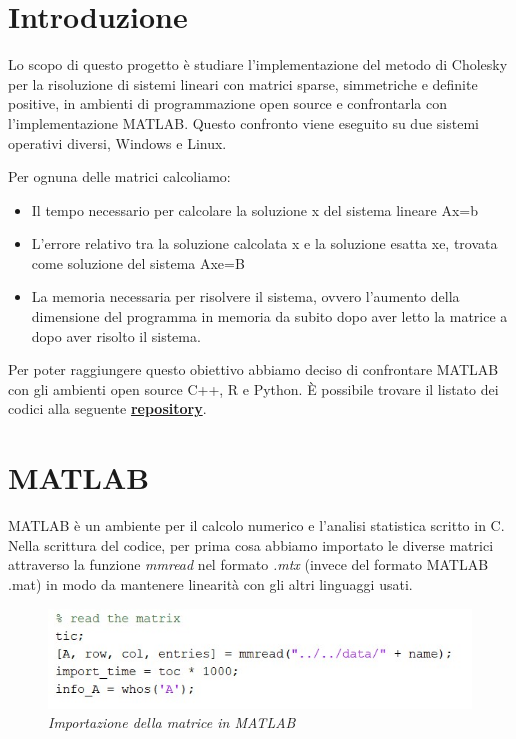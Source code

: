 \documentclass[a4paper,12pt]{article}
\begin{document}
\tableofcontents

\newpage

\section{Introduzione}
Lo scopo di questo progetto è studiare l’implementazione del metodo di Cholesky per la risoluzione di sistemi lineari con matrici sparse, simmetriche e deﬁnite positive, in ambienti di programmazione open source e confrontarla con l’implementazione MATLAB. Questo confronto viene eseguito su due sistemi operativi diversi, Windows e Linux. 
\bigskip

\noindent Per ognuna delle matrici calcoliamo:
\begin{itemize}
\item Il tempo necessario per calcolare la soluzione x del sistema lineare Ax=b
\item L’errore relativo tra la soluzione calcolata x e la soluzione esatta xe, trovata come soluzione del sistema Axe=B
\item La memoria necessaria per risolvere il sistema, ovvero l’aumento della dimensione del programma in memoria da subito dopo aver letto la matrice a dopo aver risolto il sistema.
\end{itemize} 
\bigskip

\noindent Per poter raggiungere questo obiettivo abbiamo deciso di confrontare MATLAB con gli ambienti open source C++, R e Python.
È possibile trovare il listato dei codici alla seguente \href{https://gitlab.com/okamiRvS/cholesky-computing}{\textbf{repository}}.


\newpage

\section{MATLAB}

MATLAB è un ambiente per il calcolo numerico e l’analisi statistica scritto in C. 
Nella scrittura del codice, per prima cosa abbiamo importato le diverse matrici attraverso la funzione \textit{mmread} nel formato \textit{.mtx}  (invece del formato MATLAB .mat) in modo da mantenere linearità con gli altri linguaggi usati.
\bigskip

\begin{figure}[H]
\centering
\includegraphics[width=0.6\linewidth]{img/matlab1.jpg}
\caption{\textit{Importazione della matrice in MATLAB}}
\end{figure}
\end{document}
